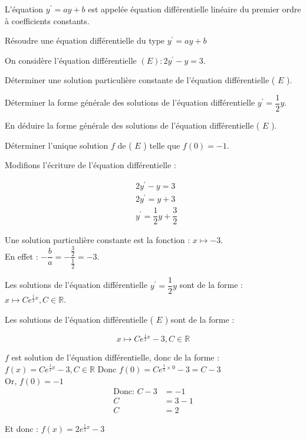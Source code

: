 \begin{brmq}
	L'équation $y^{\prime}=a y+b$ est appelée équation différentielle linéaire du premier ordre à coefficients constants.
\end{brmq}
\begin{bmethodet}{Résoudre une équation différentielle du type $y^{\prime}=a y+b$}
	
	On considère l'équation différentielle $(E): 2 y^{\prime}-y=3$.
	\begin{enumMet}
		\item Déterminer une solution particulière constante de l'équation différentielle ( $E$ ).\\
		\item Déterminer la forme générale des solutions de l'équation différentielle $y^{\prime}=\dfrac{1}{2} y$.\\
		\item En déduire la forme générale des solutions de l'équation différentielle ( $E$ ).\\
		\item Déterminer l'unique solution $f$ de ( $E$ ) telle que $f(0)=-1$.
	\end{enumMet}
	
	
	\begin{enumMet}
		\item Modifions l'écriture de l'équation différentielle :
		
		$$
		\begin{aligned}
			& 2 y^{\prime}-y=3 \\
			& 2 y^{\prime}=y+3 \\
			& y^{\prime}=\dfrac{1}{2} y+\dfrac{3}{2}
		\end{aligned}
		$$
		
		Une solution particulière constante est la fonction : $x \longmapsto-3$.\\
		En effet : $-\dfrac{b}{a}=-\dfrac{\frac{3}{2}}{\frac{1}{2}}=-3$.\\
		\item Les solutions de l'équation différentielle $y^{\prime}=\dfrac{1}{2} y$ sont de la forme : $x \mapsto C e^{\frac{1}{2} x}, C \in \mathbb{R}$.\\
		\item Les solutions de l'équation différentielle ( $E$ ) sont de la forme :
		
		$$
		x \mapsto C e^{\frac{1}{2} x}-3, C \in \mathbb{R}
		$$
		
		\item $f$ est solution de l'équation différentielle, donc de la forme : $f(x)=C e^{\frac{1}{2} x}-3, C \in \mathbb{R}$ Donc $f(0)=C e^{\frac{1}{2} \times 0}-3=C-3$\\
		Or, $f(0)=-1$
		$$
		\begin{aligned}
			\text{Donc: } C-3&=-1\\
			C&=3-1 \\
			C&=2
		\end{aligned}
		$$
		
		Et donc : $f(x)=2 e^{\frac{1}{2} x}-3$
	\end{enumMet}
\end{bmethodet}